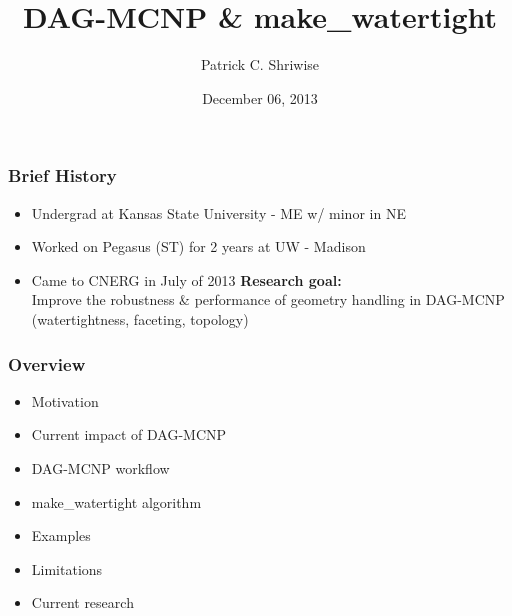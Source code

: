 \documentclass[14pt]{beamer}
\begin{document}
\title{DAG-MCNP \& make\_watertight}
\author{Patrick C. Shriwise}
\date{December 06, 2013}

\maketitle


\begin{frame}
\frametitle{Brief History}
\begin{itemize}
\item Undergrad at Kansas State University - ME w/ minor in NE
\item Worked on Pegasus (ST) for 2 years at UW - Madison
\item Came to CNERG in July of 2013
\vfill
\textbf{Research goal:} \\
Improve the robustness \& performance of geometry handling in DAG-MCNP\\
(watertightness, faceting, topology)
\end{itemize}
\end{frame}

\begin{frame}
\frametitle{Overview}

\begin{itemize}

\item Motivation
\item Current impact of DAG-MCNP
\item DAG-MCNP workflow
\item make\_watertight algorithm
\item Examples
\item Limitations
\item Current research

\end{itemize}
\end{frame}
\end{document}
